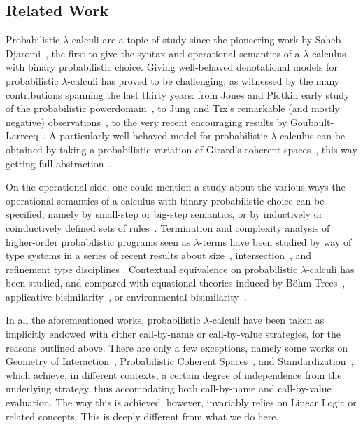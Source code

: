 \documentclass[runningheads,orivec]{llncs}
\theoremstyle{definition}
\theoremstyle{plain}
\newcommand\+[1][{}]{\kern1pt{\smallbin\oplus}_{#1}\kern1pt}
\newcommand\1{\bullet}
\newcommand\0{\circ}
\begin{document}
\subsection{Related Work}

Probabilistic $\lambda$-calculi are a topic of study since the pioneering work by Saheb-Djaromi~\cite{SahebDjahromi78}, the first to give the syntax and operational semantics of a $\lambda$-calculus with binary probabilistic choice. Giving well-behaved denotational models for probabilistic $\lambda$-calculi has proved to be challenging, as witnessed by the many contributions spanning the last thirty years: from Jones and Plotkin early study of the probabilistic powerdomain~\cite{JonesPlotkin89}, to Jung and Tix's remarkable (and mostly negative) observations~\cite{JungTix98}, to the very recent encouraging results by Goubault-Larrecq~\cite{GoubaultLarrecq19}. A particularly well-behaved model for probabilistic $\lambda$-calculus can be obtained by taking a probabilistic variation of Girard's coherent spaces~\cite{DanosEhrhard11}, this way getting full abstraction~\cite{EPT18}.

On the operational side, one could mention a study about the various ways the operational semantics of a calculus with binary probabilistic choice can be specified, namely by small-step or big-step semantics, or by inductively or coinductively defined sets of rules~\cite{DalLagoZorzi12}. Termination and complexity analysis of higher-order probabilistic programs seen as $\lambda$-terms have been studied by way of type systems in a series of recent results about size~\cite{DalLagoGrellois19}, intersection~\cite{BreuvartDalLago18}, and refinement type disciplines \cite{AvanziniDalLagoGhyselen19}. Contextual equivalence on probabilistic $\lambda$-calculi has been studied, and compared with equational theories induced by B\"ohm Trees~\cite{Leventis18}, applicative bisimilarity~\cite{DalLagoSangiorgiAlberti14}, or environmental bisimilarity~\cite{SangiorgiVignudelli16}.

In all the aforementioned works, probabilistic $\lambda$-calculi have been taken as implicitly endowed with either call-by-name or call-by-value strategies, for the reasons outlined above. There are only a few exceptions, namely some works on Geometry of Interaction~\cite{DLFVY17}, Probabilistic Coherent Spaces~\cite{EhrhardTasson19}, and Standardization~\cite{FaggianRonchi19}, which achieve, in different contexts, a certain degree of independence from the underlying strategy, thus accomodating both call-by-name and call-by-value evaluation. The way this is achieved, however, invariably relies on Linear Logic or related concepts. This is deeply different from what we do here.
\end{document}
